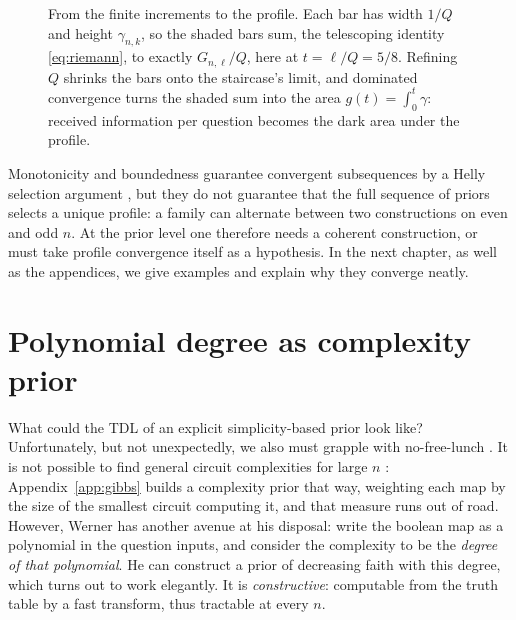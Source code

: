 \documentclass[11pt]{article}
\let\stdsection\section
\renewcommand{\section}{\clearpage\stdsection}
\begin{document}
\begin{figure}[H]
\caption{From the finite increments to the profile.
Each bar has width $1/Q$ and height $\gamma_{n,k}$, so the shaded
bars sum, the telescoping identity \eqref{eq:riemann}, to
exactly $G_{n,\ell}/Q$, here at $t=\ell/Q = 5/8$. Refining $Q$ shrinks
the bars onto the staircase's limit, and dominated convergence turns
the shaded sum into the area $g(t) = \int_0^t \gamma$: received
information per question becomes the dark area under the profile.}
\label{fig:riemann}
\end{figure}

Monotonicity and boundedness guarantee convergent subsequences by a
Helly selection argument \cite{rudin}, but they do not guarantee that the full
sequence of priors selects a unique profile: a family can alternate
between two constructions on even and odd $n$. At the prior level one
therefore needs a coherent construction, or must take profile convergence itself as a hypothesis. 
In the next chapter, as well as the appendices, we give examples and explain why they converge neatly.

\section{Polynomial degree as complexity prior}\label{sec:shapeprior}

What could the TDL of an explicit simplicity-based prior look like? Unfortunately, but
not unexpectedly, we also must grapple with no-free-lunch \cite{wolpert96}. It is not possible to find 
general circuit complexities for large $n$ \cite{kabanetscai00}: Appendix~\ref{app:gibbs} builds
a complexity prior that way, weighting each map by the size of the
smallest circuit computing it, and that measure runs out of road. However, Werner has 
another avenue at his disposal: write the boolean map as a polynomial in the question inputs, 
and consider the complexity to be the \emph{degree of that polynomial}. He can construct a prior
of decreasing faith with this degree, which turns out to work elegantly. It is \emph{constructive}: computable from the truth table by a fast
transform, thus tractable at every $n$.
\end{document}
